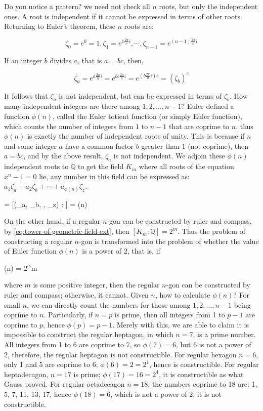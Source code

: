 Do you notice a pattern? we need not check all $n$ roots, but only the independent ones. A root is independent if it cannot be expressed in terms of other roots. Returning to Euler's theorem, these $n$ roots are:

\[
\zeta_0 = e^0 = 1, \zeta_1 = e^{1\frac{2\pi}{n}i}, \dotsb, \zeta_{n-1} = e^{(n - 1)\frac{2\pi}{n}i}
\]

If an integer $b$ divides $a$, that is $a = bc$, then,

\[
\zeta_a = e^{a\frac{2\pi}{n}i} = e^{bc\frac{2\pi}{n}i} = e^{(b\frac{2\pi}{n}i)c} = (\zeta_b)^c
\]

 
It follows that $\zeta_a$ is not independent, but can be expressed in terms of $\zeta_b$. How many independent integers are there among $1, 2, \dotsc, n-1$? Euler defined a function $\phi(n)$, called the Euler totient function (or simply Euler function), which counts the number of integers from $1$ to $n-1$ that are coprime to $n$, thus $\phi(n)$ is exactly the number of independent roots of unity. This is because if $n$ and some integer $a$ have a common factor $b$ greater than 1 (not coprime), then $a = bc$, and by the above result, $\zeta_a$ is not independent. We adjoin these $\phi(n)$ independent roots to $\mathbb{Q}$ to get the field $K_m$ where all roots of the equation $x^n - 1 = 0$ lie, any number in this field can be expressed as: $a_1 \zeta_a + a_2\zeta_b + \dotsb + a_{\phi(n)}\zeta_z$.

\be
[K_m : \mathbb{Q}] = [(\zeta_a, \zeta_b, \dotsc, \zeta_z) : ] = \phi(n)
\ee

On the other hand, if a regular $n$-gon can be constructed by ruler and compass, by \cref{eq:tower-of-geometric-field-ext}, then $[K_m : \mathbb{Q}] = 2^m$. Thus the problem of constructing a regular $n$-gon is transformed into the problem of whether the value of Euler function $\phi(n)$ is a power of 2, that is, if

\be
\phi(n) = 2^m
\label{eq:euler-function-as-power-of-2}
\ee

where $m$ is some positive integer, then the regular $n$-gon can be constructed by ruler and compass; otherwise, it cannot. Given $n$, how to calculate $\phi(n)$? For small $n$, we can directly count the numbers for those among $1, 2, \dotsc, n - 1$ being coprime to $n$. Particularly, if $n = p$ is prime, then all integers from 1 to $p-1$ are coprime to $p$, hence $\phi(p) = p - 1$. Merely with this, we are able to claim it is impossible to construct the regular heptagon, in which $n = 7$, is a prime number. All integers from 1 to 6 are coprime to 7, so $\phi(7) = 6$, but 6 is not a power of 2, therefore, the regular heptagon is not constructible. For regular hexagon $n = 6$, only 1 and 5 are coprime to 6; $\phi(6) = 2 = 2^1$, hence is constructible. For regular heptadecagon, $n = 17$ is prime; $\phi(17) = 16 = 2^4$, it is constructible as what Gauss proved. For regular octadecagon $n = 18$, the numbers coprime to 18 are: 1, 5, 7, 11, 13, 17, hence $\phi(18) = 6$, which is not a power of 2; it is not constructible.


